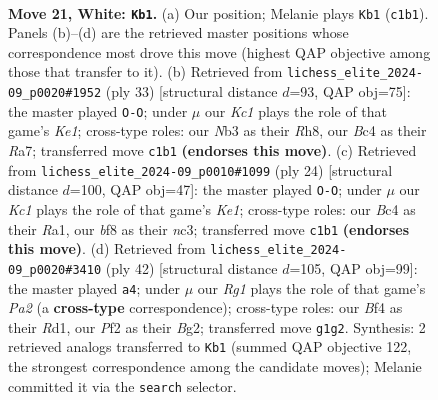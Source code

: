 \documentclass[11pt]{article}
\begin{document}
\clearpage

\begin{figure}[p]\centering
\begin{subfigure}{0.46\textwidth}\centering
\resizebox{\linewidth}{!}{%
\newchessgame
\chessboard[
  setfen={r1b2b1r/5k1p/ppn1p1p1/4Pp2/n1B2B2/1N3NP1/PP3P1P/R1K3R1 w - - 2 21},
  showmover=false,
  pgfstyle=straightmove, color=movearrow, markmove={c1-b1}
]}
\caption{}
\end{subfigure}\hfill
\begin{subfigure}{0.46\textwidth}\centering
\resizebox{\linewidth}{!}{%
\newchessgame
\chessboard[
  setfen={4k2r/r4ppp/1Npbpn2/P2p1b2/8/5PP1/1P1BP2P/R3KB1R b KQk - 0 17},
  showmover=false,
  pgfstyle=straightmove, color=movearrow, markmove={e8-g8}
]}
\caption{}
\end{subfigure}
\\[4pt]
\begin{subfigure}{0.46\textwidth}\centering
\resizebox{\linewidth}{!}{%
\newchessgame
\chessboard[
  setfen={r1b1k2r/pp3ppp/2n1p3/3p4/3P4/1PnBPNB1/5PPP/R3K2R w KQkq - 0 13},
  showmover=false,
  pgfstyle=straightmove, color=movearrow, markmove={e1-g1}
]}
\caption{}
\end{subfigure}\hfill
\begin{subfigure}{0.46\textwidth}\centering
\resizebox{\linewidth}{!}{%
\newchessgame
\chessboard[
  setfen={r1b2rk1/pp3pp1/1bp4p/4P3/4NBn1/6P1/PP3PBP/R2R2K1 w - - 0 22},
  showmover=false,
  pgfstyle=straightmove, color=movearrow, markmove={a2-a4}
]}
\caption{}
\end{subfigure}
\caption{\textbf{Move 21, White: \texttt{Kb1}.} (a) Our position; Melanie plays \texttt{Kb1} (\texttt{c1b1}). Panels (b)--(d) are the retrieved master positions whose correspondence most drove this move (highest QAP objective among those that transfer to it). (b) Retrieved from \texttt{lichess\_elite\_2024-09\_p0020\#1952} (ply 33) [structural distance $d$=93, QAP obj=75]: the master played \texttt{O-O}; under $\mu$ our \emph{Kc1} plays the role of that game's \emph{Ke1}; cross-type roles: our \emph{N}b3 as their \emph{R}h8, our \emph{B}c4 as their \emph{R}a7; transferred move \texttt{c1b1} \textbf{(endorses this move)}. (c) Retrieved from \texttt{lichess\_elite\_2024-09\_p0010\#1099} (ply 24) [structural distance $d$=100, QAP obj=47]: the master played \texttt{O-O}; under $\mu$ our \emph{Kc1} plays the role of that game's \emph{Ke1}; cross-type roles: our \emph{B}c4 as their \emph{R}a1, our \emph{b}f8 as their \emph{n}c3; transferred move \texttt{c1b1} \textbf{(endorses this move)}. (d) Retrieved from \texttt{lichess\_elite\_2024-09\_p0020\#3410} (ply 42) [structural distance $d$=105, QAP obj=99]: the master played \texttt{a4}; under $\mu$ our \emph{Rg1} plays the role of that game's \emph{Pa2} (a \textbf{cross-type} correspondence); cross-type roles: our \emph{B}f4 as their \emph{R}d1, our \emph{P}f2 as their \emph{B}g2; transferred move \texttt{g1g2}. Synthesis: 2 retrieved analogs transferred to \texttt{Kb1} (summed QAP objective 122, the strongest correspondence among the candidate moves); Melanie committed it via the \texttt{search} selector.}
\label{fig:thought-m40}
\end{figure}
\end{document}
